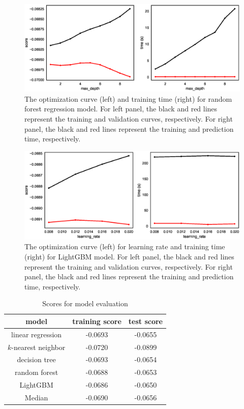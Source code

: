 \documentclass[12pt]{article}
\begin{document}
\begin{figure}[!ht]
	\centering
	\includegraphics[width=0.9\linewidth]{pic/random_forest_opt}
	\caption{The optimization curve (left) and training time (right) for random forest regression model. For left panel, the black and red lines represent the training and validation curves, respectively. For right panel, the black and red lines represent the training and prediction time, respectively.}
	\label{fig:random_forest_opt}
\end{figure}

\begin{figure}[!ht]
	\centering
	\includegraphics[width=0.9\linewidth]{pic/lightgbm_lr_opt}
	\caption{The optimization curve (left) for learning rate and training time (right) for LightGBM model. For left panel, the black and red lines represent the training and validation curves, respectively. For right panel, the black and red lines represent the training and prediction time, respectively.}
	\label{fig:lightgbm_lr_opt}
\end{figure}

\begin{table}[!ht]
	\centering
	\footnotesize
	\caption{Scores for model evaluation}
	\label{tab:score-model-evaluation}
	\begin{tabular}{|c|c|c|}
		\hline model & training score  & test score\\  
		\hline  linear regression & -0.0693 & -0.0655\\
		\hline  $k$-nearest neighbor & -0.0720 & -0.0899\\
		\hline  decision tree & -0.0693 & -0.0654\\
		\hline  random forest & -0.0688  & -0.0653\\
		\hline  LightGBM & -0.0686  & -0.0650\\
		\hline  Median & -0.0690 & -0.0656\\
		\hline
	\end{tabular} 
\end{table}
\end{document}
